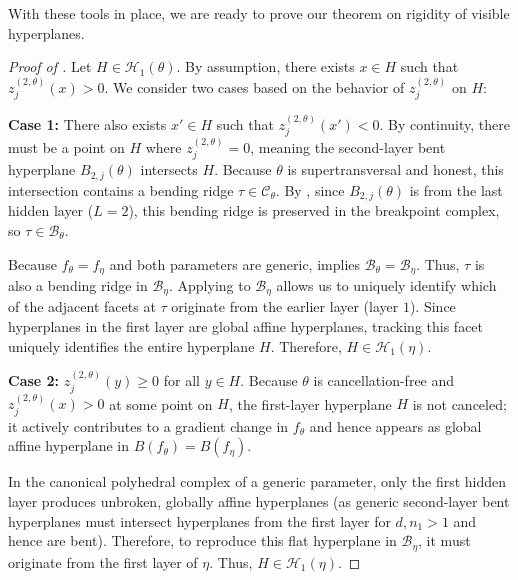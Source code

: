 \documentclass{article}
\theoremstyle{definition}
\newcommand{\complex}{\mathcal{C}}
\newcommand{\preactivation}[1]{z^{(#1)}}
\newcommand{\hyperplanes}[2]{\mathcal{H}_{#1}(#2)}
\newcommand{\breakpoints}[1]{B({#1})}
\newcommand{\bcomplex}[1]{\mathcal{B}_{#1}}
\begin{document}
With these tools in place, we are ready to prove our theorem on rigidity of visible hyperplanes. 

\thmintersectedhyperplanesstay*

\begin{proof}[Proof of ] 
Let $H \in \hyperplanes{1}{\theta}$. By assumption, there exists $x \in H$ such that $\preactivation{2,\theta}_j(x) > 0$. We consider two cases based on the behavior of $\preactivation{2,\theta}_j$ on $H$:

\textbf{Case 1:} There also exists $x' \in H$ such that $\preactivation{2,\theta}_j(x') < 0$. 
By continuity, there must be a point on $H$ where $\preactivation{2,\theta}_j = 0$, meaning the second-layer bent hyperplane $B_{2,j}(\theta)$ intersects $H$. Because $\theta$ is supertransversal and honest, this intersection contains a bending ridge $\tau \in \complex_\theta$. 
By , since $B_{2,j}(\theta)$ is from the last hidden layer ($L=2$), this bending ridge is preserved in the breakpoint complex, so $\tau \in \bcomplex{\theta}$. 

Because $f_\theta = f_\eta$ and both parameters are generic,  implies $\bcomplex{\theta} = \bcomplex{\eta}$. Thus, $\tau$ is also a bending ridge in $\bcomplex{\eta}$. Applying  to $\bcomplex{\eta}$ allows us to uniquely identify which of the adjacent facets at $\tau$ originate from the earlier layer (layer $1$). Since hyperplanes in the first layer are global affine hyperplanes, 
tracking this facet uniquely identifies the entire hyperplane $H$. 
Therefore, $H \in \hyperplanes{1}{\eta}$. 

\textbf{Case 2:} $\preactivation{2,\theta}_j(y) \ge 0$ for all $y \in H$. 
Because $\theta$ is cancellation-free and $\preactivation{2,\theta}_j(x) > 0$ at some point on $H$, the first-layer hyperplane $H$ is not canceled; 
it actively contributes to a gradient change in $f_\theta$ and hence appears as global affine hyperplane in $\breakpoints{f_\theta} = \breakpoints{f_\eta}$. 

In the canonical polyhedral complex of a generic parameter, only the first hidden layer produces unbroken, globally affine hyperplanes (as generic second-layer bent hyperplanes must intersect hyperplanes from the first layer for $d,n_1>1$ and hence are bent). 
Therefore, to reproduce this flat hyperplane in $\bcomplex{\eta}$, it must originate from the first layer of $\eta$. 
Thus, $H \in \hyperplanes{1}{\eta}$. 


\end{proof}
\end{document}
